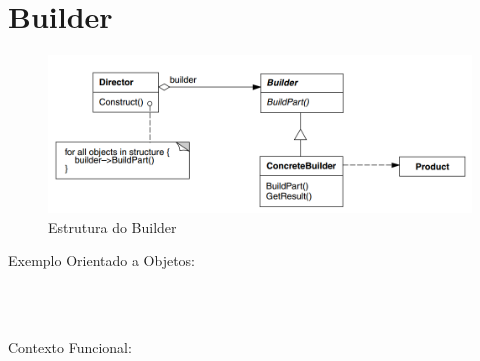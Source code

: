\section{Builder}

\begin{figure}[htb]
	\caption{\label{builder_struct}Estrutura do Builder}
	\begin{center}
	    \includegraphics[scale=0.4]{5_padroes-contexto-funcional/5.1_criacionais/5.1.3_builder/diagram.png}
	\end{center}
\end{figure}

Exemplo Orientado a Objetos:

\begin{lstlisting}[caption={Builder Orientado a Objetos},label=oobuilder]



\end{lstlisting}

Contexto Funcional:


\begin{lstlisting}[caption={Builder Funcional},label=fpbuilder]
    

    
\end{lstlisting}
